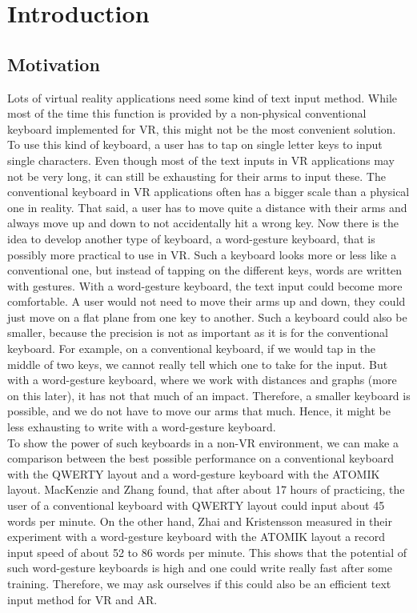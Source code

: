 \chapter{Introduction}

\section{Motivation}
Lots of virtual reality applications need some kind of text input method. While most of the time this function is provided by a non-physical conventional keyboard implemented for VR, this might not be the most convenient solution. To use this kind of keyboard, a user has to tap on single letter keys to input single characters. Even though most of the text inputs in VR applications may not be very long, it can still be exhausting for their arms to input these. The conventional keyboard in VR applications often has a bigger scale than a physical one in reality. That said, a user has to move quite a distance with their arms and always move up and down to not accidentally hit a wrong key. Now there is the idea to develop another type of keyboard, a word-gesture keyboard, that is possibly more practical to use in VR. Such a keyboard looks more or less like a conventional one, but instead of tapping on the different keys, words are written with gestures. With a word-gesture keyboard, the text input could become more comfortable. A user would not need to move their arms up and down, they could just move on a flat plane from one key to another. Such a keyboard could also be smaller, because the precision is not as important as it is for the conventional keyboard. For example, on a conventional keyboard, if we would tap in the middle of two keys, we cannot really tell which one to take for the input. But with a word-gesture keyboard, where we work with distances and graphs (more on this later), it has not that much of an impact. Therefore, a smaller keyboard is possible, and we do not have to move our arms that much. Hence, it might be less exhausting to write with a word-gesture keyboard.\\
To show the power of such keyboards in a non-VR environment, we can make a comparison between the best possible performance on a conventional keyboard with the QWERTY layout and a word-gesture keyboard with the ATOMIK layout. MacKenzie and Zhang \cite{MacKenzie_Zhang_SoftKeyboard} found, that after about 17 hours of practicing, the user of a conventional keyboard with QWERTY layout could input about 45 words per minute. On the other hand, Zhai and Kristensson \cite{Kristensson2004SHARK2AL} measured in their experiment with a word-gesture keyboard with the ATOMIK layout a record input speed of about 52 to 86 words per minute. This shows that the potential of such word-gesture keyboards is high and one could write really fast after some training. Therefore, we may ask ourselves if this could also be an efficient text input method for VR and AR.


